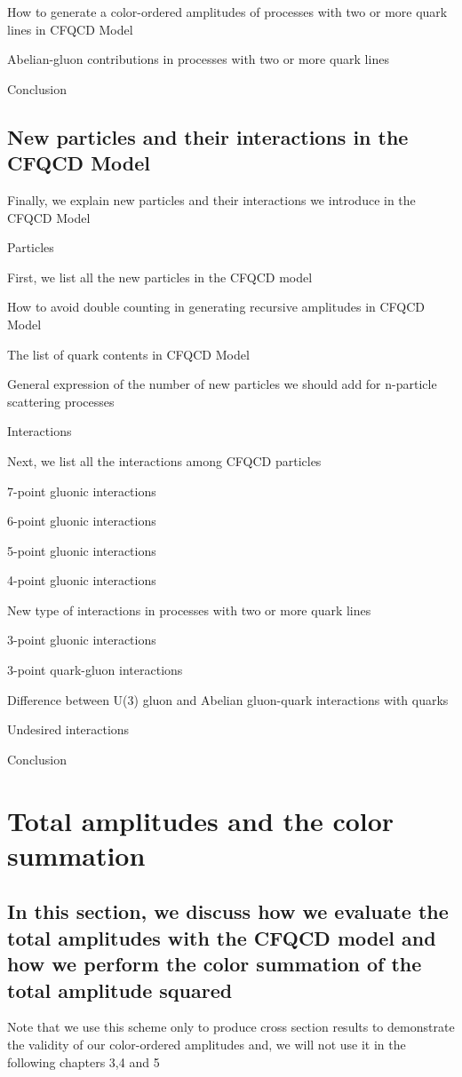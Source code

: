 \documentclass{book}
\begin{document}
How to generate a color-ordered amplitudes of processes with two or more quark lines in CFQCD Model

Abelian-gluon contributions in processes with two or more quark lines

Conclusion

\subsection{New particles and their interactions in the CFQCD Model}
Finally, we explain new particles and their interactions we introduce in the CFQCD Model

Particles

First, we list all the new particles in the CFQCD model

How to avoid double counting in generating recursive amplitudes in CFQCD Model

The list of quark contents in CFQCD Model

General expression of the number of new particles we should add for n-particle scattering processes

Interactions

Next, we list all the interactions among CFQCD particles

7-point gluonic interactions

6-point gluonic interactions

5-point gluonic interactions

4-point gluonic interactions

New type of  interactions in processes with two or more quark lines

3-point  gluonic interactions

3-point quark-gluon interactions

Difference between U(3) gluon and Abelian gluon-quark interactions with quarks

Undesired interactions

Conclusion

\section{Total amplitudes and the color summation}
\subsection{In this section, we discuss how we evaluate the total amplitudes with the CFQCD model and how we perform the color summation of the total amplitude squared}
Note that we use this scheme only to produce cross section results to demonstrate the validity of our color-ordered amplitudes and, we will not use it in the following chapters 3,4 and 5
\end{document}
